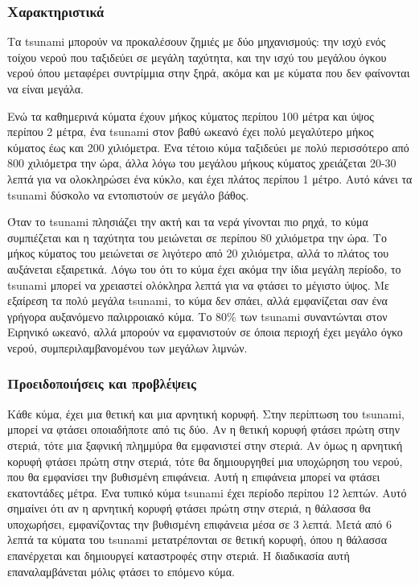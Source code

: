 \subsubsection{Χαρακτηριστικά}
Τα tsunami μπορούν να προκαλέσουν ζημιές με δύο μηχανισμούς: την ισχύ ενός τοίχου νερού που ταξιδεύει σε μεγάλη ταχύτητα, και την ισχύ του μεγάλου όγκου νερού όπου μεταφέρει συντρίμμια στην ξηρά, ακόμα και με κύματα που δεν φαίνονται να είναι μεγάλα.

Ενώ τα καθημερινά κύματα έχουν μήκος κύματος περίπου 100 μέτρα και ύψος περίπου 2 μέτρα, ένα tsunami στον βαθύ ωκεανό έχει πολύ μεγαλύτερο μήκος κύματος έως και 200 χιλιόμετρα. Ένα τέτοιο κύμα ταξιδεύει με πολύ περισσότερο από 800 χιλιόμετρα την ώρα, άλλα λόγω του μεγάλου μήκους κύματος χρειάζεται 20-30 λεπτά για να ολοκληρώσει ένα κύκλο, και έχει πλάτος περίπου 1 μέτρο. Αυτό κάνει τα tsunami δύσκολο να εντοπιστούν σε μεγάλο βάθος.

Όταν το tsunami πλησιάζει την ακτή και τα νερά γίνονται πιο ρηχά, το κύμα συμπιέζεται και η ταχύτητα του μειώνεται σε περίπου 80 χιλιόμετρα την ώρα. Το μήκος κύματος του μειώνεται σε λιγότερο από 20 χιλιόμετρα, αλλά το πλάτος του αυξάνεται εξαιρετικά. Λόγω του ότι το κύμα έχει ακόμα την ίδια μεγάλη περίοδο, το tsunami μπορεί να χρειαστεί ολόκληρα λεπτά για να φτάσει το μέγιστο ύψος. Με εξαίρεση τα πολύ μεγάλα tsunami, το κύμα δεν σπάει, αλλά εμφανίζεται σαν ένα γρήγορα αυξανόμενο παλιρροιακό κύμα. Το 80\% των tsunami συναντώνται στον Ειρηνικό ωκεανό, αλλά μπορούν να εμφανιστούν σε όποια περιοχή έχει μεγάλο όγκο νερού, συμπεριλαμβανομένου των μεγάλων λιμνών.

\subsubsection{Προειδοποιήσεις και προβλέψεις}
Κάθε κύμα, έχει μια θετική και μια αρνητική κορυφή. Στην περίπτωση του tsunami, μπορεί να φτάσει οποιαδήποτε από τις δύο. Αν η θετική κορυφή φτάσει πρώτη στην στεριά, τότε μια ξαφνική πλημμύρα θα εμφανιστεί στην στεριά. Αν όμως η αρνητική κορυφή φτάσει πρώτη στην στεριά, τότε θα δημιουργηθεί μια υποχώρηση του νερού, που θα εμφανίσει την βυθισμένη επιφάνεια. Αυτή η επιφάνεια μπορεί να φτάσει εκατοντάδες μέτρα. Ένα τυπικό κύμα tsunami έχει περίοδο περίπου 12 λεπτών. Αυτό σημαίνει ότι αν η αρνητική κορυφή φτάσει πρώτη στην στεριά, η θάλασσα θα υποχωρήσει, εμφανίζοντας την βυθισμένη επιφάνεια μέσα σε 3 λεπτά. Μετά από 6 λεπτά τα κύματα του tsunami μετατρέπονται σε θετική κορυφή, όπου η θάλασσα επανέρχεται και δημιουργεί καταστροφές στην στεριά. Η διαδικασία αυτή επαναλαμβάνεται μόλις φτάσει το επόμενο κύμα.

